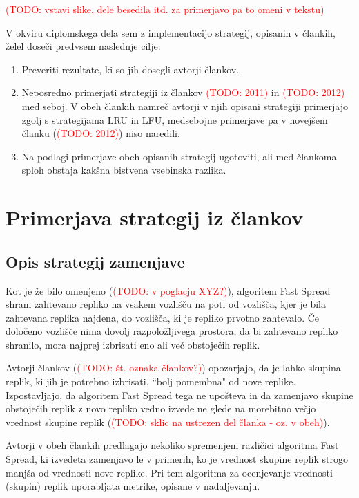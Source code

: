 \documentclass[a4paper, 12pt]{book}
\newcommand{\TODO}[1]{\textcolor{red}{(TODO: #1)}}
\begin{document}
\TODO{vstavi slike, dele besedila itd. za primerjavo pa to omeni v tekstu}

V okviru diplomskega dela sem z implementacijo strategij, opisanih v
člankih, želel doseči predvsem naslednje cilje:
\label{cilji}

\begin{enumerate}
\item Preveriti rezultate, ki so jih dosegli avtorji člankov.

\item Neposredno primerjati strategiji iz člankov \TODO{2011} in
\TODO{2012} med seboj. V obeh člankih namreč avtorji v njih opisani
strategiji primerjajo zgolj s strategijama LRU in LFU, medsebojne
primerjave pa v novejšem članku (\TODO{2012}) niso naredili.

\item Na podlagi primerjave obeh opisanih strategij ugotoviti, ali med
člankoma sploh obstaja kakšna bistvena vsebinska razlika.
\end{enumerate}


\chapter{Primerjava strategij iz člankov}

\section{Opis strategij zamenjave}
Kot je že bilo omenjeno (\TODO{v poglacju XYZ?}), algoritem Fast Spread
shrani zahtevano repliko na vsakem vozlišču na poti od vozlišča, kjer je
bila zahtevana replika najdena, do vozlišča, ki je repliko prvotno
zahtevalo. Če določeno vozlišče nima dovolj razpoložljivega prostora,
da bi zahtevano repliko shranilo, mora najprej izbrisati eno ali več
obstoječih replik.

Avtorji člankov (\TODO{št. oznaka člankov?}) opozarjajo, da je lahko
skupina replik, ki jih je potrebno izbrisati, ``bolj pomembna" od
nove replike. Izpostavljajo, da algoritem Fast Spread tega ne upošteva in
da zamenjavo skupine obstoječih replik z novo repliko vedno
izvede ne glede na morebitno večjo vrednost skupine replik
(\TODO{sklic na ustrezen del članka - oz. v obeh}).

Avtorji v obeh člankih predlagajo nekoliko spremenjeni različici algoritma
Fast Spread, ki izvedeta zamenjavo le v primerih, ko je vrednost skupine
replik strogo manjša od vrednosti nove replike. Pri tem algoritma za
ocenjevanje vrednosti (skupin) replik uporabljata metrike, opisane v
nadaljevanju.
\end{document}
